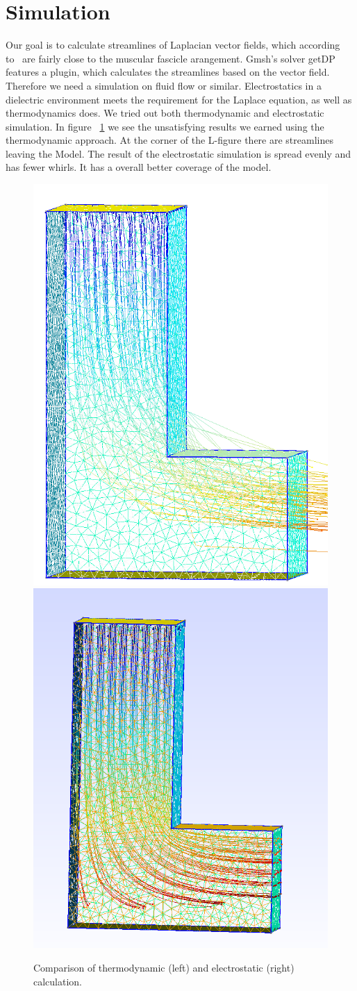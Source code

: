 \documentclass[preprint,journal]{vgtc}       %
\begin{document}
\section{Simulation}
Our goal is to calculate streamlines of Laplacian vector fields, which according to~\cite{Choi2013} are fairly close to the muscular fascicle arangement. %
Gmsh's solver getDP features a plugin, which calculates the streamlines based on the vector field. 
Therefore we need a simulation on fluid flow or similar. %
Electrostatics in a dielectric environment meets the requirement for the Laplace equation, as well as thermodynamics does.
We tried out both thermodynamic and electrostatic simulation. 
In figure ~\ref{fig:L} we see the unsatisfying results we earned using the thermodynamic approach. 
At the corner of the L-figure there are streamlines leaving the Model. 
The result of the electrostatic simulation is spread evenly and has fewer whirls. 
It has a overall better coverage of the model.

\begin{figure}
	
	\begin{minipage}{\linewidth}
		\includegraphics[width=.5\linewidth]{L.PNG} 
		\includegraphics[width=.53\linewidth]{L-ele.png}
		\caption{Comparison of thermodynamic (left) and electrostatic (right) calculation.}
		\label{fig:L}
	\end{minipage}
\end{figure}
\end{document}
